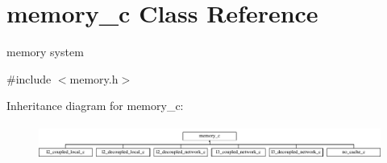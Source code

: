 \hypertarget{classmemory__c}{
\section{memory\_\-c Class Reference}
\label{classmemory__c}
}


memory system  




{\ttfamily \#include $<$memory.h$>$}

Inheritance diagram for memory\_\-c:\begin{figure}[H]
\begin{center}
\leavevmode
\includegraphics[height=1.159420cm]{classmemory__c}
\end{center}
\end{figure}
